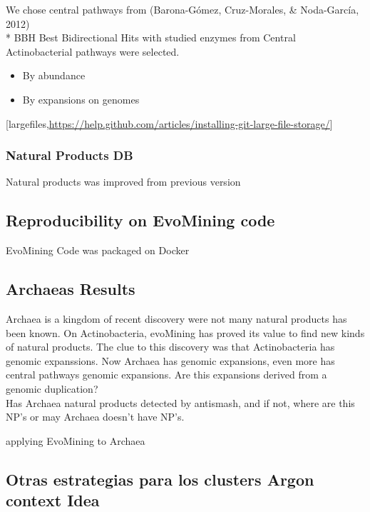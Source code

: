 \documentclass[12pt,twoside]{reedthesis}
\begin{document}
  We chose central pathways from (Barona-Gómez, Cruz-Morales, \&
  Noda-García, 2012)\\
  * BBH Best Bidirectional Hits with studied enzymes from Central
  Actinobacterial pathways were selected.
  
  \begin{itemize}
  \item
    By abundance
  \item
    By expansions on genomes
  \end{itemize}
  
  {[}largefiles,\url{https://help.github.com/articles/installing-git-large-file-storage/}{]}
  
  \subsubsection{Natural Products DB}\label{natural-products-db}
  
  Natural products was improved from previous version
  
  \subsection{Reproducibility on EvoMining
  code}\label{reproducibility-on-evomining-code}
  
  EvoMining Code was packaged on Docker
  
  \subsection{Archaeas Results}\label{archaeas-results}
  
  Archaea is a kingdom of recent discovery were not many natural products
  has been known. On Actinobacteria, evoMining has proved its value to
  find new kinds of natural products. The clue to this discovery was that
  Actinobacteria has genomic expanssions. Now Archaea has genomic
  expansions, even more has central pathways genomic expansions. Are this
  expansions derived from a genomic duplication?\\
  Has Archaea natural products detected by antismash, and if not, where
  are this NP's or may Archaea doesn't have NP's.
  
  applying EvoMining to Archaea
  
  \subsection{Otras estrategias para los clusters Argon context
  Idea}\label{otras-estrategias-para-los-clusters-argon-context-idea}
  
\end{document}
